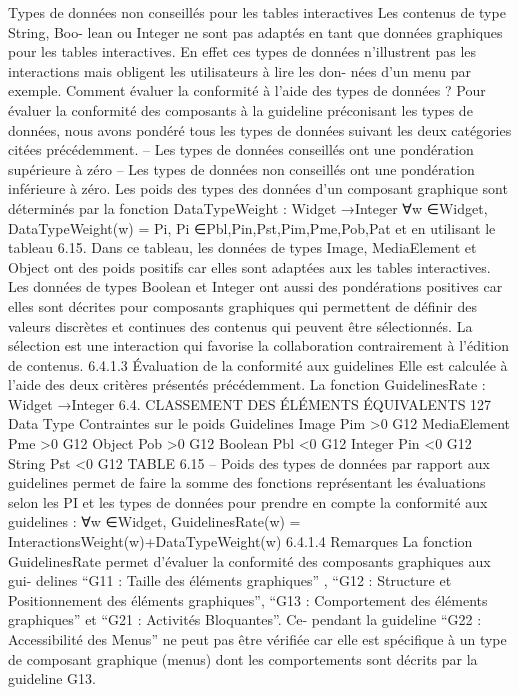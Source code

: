 \documentclass{article}
\begin{document}
Types de données non conseillés pour les tables interactives
Les contenus de type String, Boo-
lean ou Integer ne sont pas adaptés en tant que données graphiques pour les tables interactives. En
effet ces types de données n’illustrent pas les interactions mais obligent les utilisateurs à lire les don-
nées d’un menu par exemple.
Comment évaluer la conformité à l’aide des types de données ?
Pour évaluer la conformité des
composants à la guideline préconisant les types de données, nous avons pondéré tous les types de
données suivant les deux catégories citées précédemment.
– Les types de données conseillés ont une pondération supérieure à zéro
– Les types de données non conseillés ont une pondération inférieure à zéro.
Les poids des types des données d’un composant graphique sont déterminés par la fonction
DataTypeWeight : Widget →{Integer}
∀w ∈{Widget},
DataTypeWeight(w) = Pi, Pi ∈{Pbl,Pin,Pst,Pim,Pme,Pob,Pat}
et en utilisant le tableau 6.15. Dans ce tableau, les données de types Image, MediaElement et Object
ont des poids positifs car elles sont adaptées aux les tables interactives. Les données de types Boolean
et Integer ont aussi des pondérations positives car elles sont décrites pour composants graphiques qui
permettent de déﬁnir des valeurs discrètes et continues des contenus qui peuvent être sélectionnés. La
sélection est une interaction qui favorise la collaboration contrairement à l’édition de contenus.
6.4.1.3
Évaluation de la conformité aux guidelines
Elle est calculée à l’aide des deux critères présentés précédemment. La fonction
GuidelinesRate : Widget →Integer
6.4. CLASSEMENT DES ÉLÉMENTS ÉQUIVALENTS
127
Data Type
Contraintes sur le
poids
Guidelines
Image
Pim >0
G12
MediaElement
Pme >0
G12
Object
Pob >0
G12
Boolean
Pbl <0
G12
Integer
Pin <0
G12
String
Pst <0
G12
TABLE 6.15 – Poids des types de données par rapport aux guidelines
permet de faire la somme des fonctions représentant les évaluations selon les PI et les types de données
pour prendre en compte la conformité aux guidelines :
∀w ∈{Widget},
GuidelinesRate(w) = InteractionsWeight(w)+DataTypeWeight(w)
6.4.1.4
Remarques
La fonction GuidelinesRate permet d’évaluer la conformité des composants graphiques aux gui-
delines “G11 : Taille des éléments graphiques” , “G12 : Structure et Positionnement des éléments
graphiques”, “G13 : Comportement des éléments graphiques” et “G21 : Activités Bloquantes”. Ce-
pendant la guideline “G22 : Accessibilité des Menus” ne peut pas être vériﬁée car elle est spéciﬁque
à un type de composant graphique (menus) dont les comportements sont décrits par la guideline G13.
\end{document}
